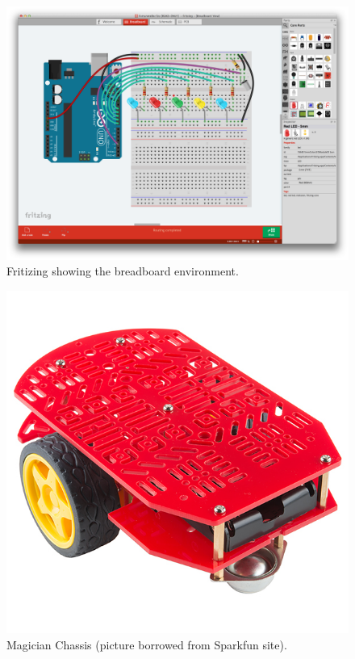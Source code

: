 \begin{figure}[t]
\centering
\centering%
\includegraphics[height=.35\textwidth]{img/FritzingBreadBoard.png}
\caption{Fritizing showing the breadboard environment.}
\label{fig:breadboard}%
\end{figure}

\begin{figure}[t]
\centering
\centering%
\includegraphics[height=.35\textwidth]{img/magician.jpg}
\caption{Magician Chassis (picture borrowed from Sparkfun site).}
\label{fig:mag}%
\end{figure}

